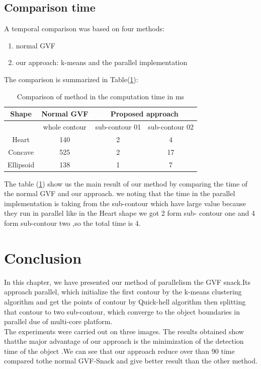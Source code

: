 \subsection{Comparison time}\label{subsec:comparison-time}
A temporal comparison was based on four methods:
\begin{enumerate}
    \item normal GVF
    \item our approach: k-means and the parallel implementation
\end{enumerate}
The comparison is summarized in Table(\ref{tab:table04}):\\

\begin{table}[H]
    \centering
    \begin{tabular}{ |c|c|c|c| }
        \hline
        \textbf{Shape} &  \textbf{Normal GVF} & \multicolumn{2}{|c|}{\textbf{Proposed approach}} \\
        \hline
        & whole contour  & sub-contour 01  & sub-contour 02 \\
        \hline
        Heart & 140 & 2 & 4 \\
        \hline
        Concave & 525 & 2 & 17 \\
        \hline
        Ellipsoid & 138 & 1 & 7 \\

        \hline
    \end{tabular}
    \caption{Comparison of method in the computation time in ms}
    \label{tab:table04}
\end{table}

\hspace{-0.6cm}The table (\ref{tab:table04}) show us the main result of our method by comparing
the time of the normal GVF and our approach. we noting that
the time in the parallel implementation is taking from the sub-contour which have
large value because they run in parallel like in the Heart shape we got 2 form sub-
contour one and 4 form sub-contour two ,so the total time is 4.

\section{Conclusion}\label{sec:conclusion}

In this chapter, we have presented our method of parallelism the GVF snack.Its
approach parallel, which initialize the first contour by the k-means clustering
algorithm and get the points of contour by Quick-hell algorithm then splitting that
contour to two sub-contour, which converge to the object boundaries in parallel due
of multi-core platform.\\
The experiments were carried out on three images. The results obtained show
thatthe major advantage of our approach is the minimization of the detection time
of the object .We can see that our approach reduce over than 90%
time compared tothe normal GVF-Snack and give better result than the other
method.